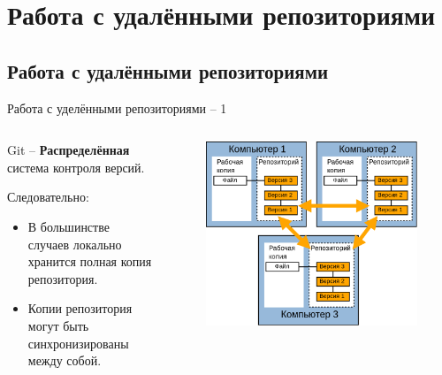 \documentclass[presentation]{beamer}
\begin{document}


\section{Работа с удалёнными репозиториями}

\subsection{Работа с удалёнными репозиториями}

\begin{frame}{Работа с уделёнными репозиториями -- 1}
  \begin{columns}
    \begin{column}{.5\textwidth}
      \raisebox{-.30em}{\Large\HandRight}\hspace{.25em} Git --
      \textbf{Распределённая} система контроля версий.\newline\newline

      Следовательно:
      \begin{itemize}
      \item В большинстве случаев локально хранится полная копия
        репозитория.
      \item Копии репозитория могут быть синхронизированы между собой.
      \end{itemize}
    \end{column}
    \begin{column}{.5\textwidth}
      \begin{figure}[htb]
        \centering
        \includegraphics[height=.6\textheight]{vcs-decentralized}
      \end{figure}
    \end{column}
  \end{columns}
\end{frame}
\end{document}
